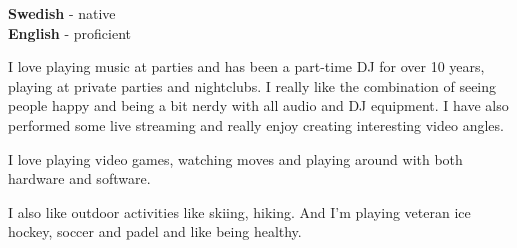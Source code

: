 \documentclass[9pt]{template} %
\begin{document}

\begin{minipage}[t]{0.3\textwidth}
  \vspace{-\baselineskip} %


  \textbf{Swedish} - native\\
  \textbf{English} - proficient
\end{minipage}
\hfill
\begin{minipage}[t]{0.7\textwidth}
  \vspace{-\baselineskip} %


  I love playing music at parties and has been a part-time DJ for over 10 years,
  playing at private parties and nightclubs. I really like the combination of seeing
  people happy and being a bit nerdy with all audio and DJ equipment. I have also
  performed some live streaming and really enjoy creating interesting video angles.

  I love playing video games, watching moves and playing around with both hardware
  and software.

  I also like outdoor activities like skiing, hiking. And I'm playing veteran
  ice hockey, soccer and padel and like being healthy.
\end{minipage}


\end{document}
